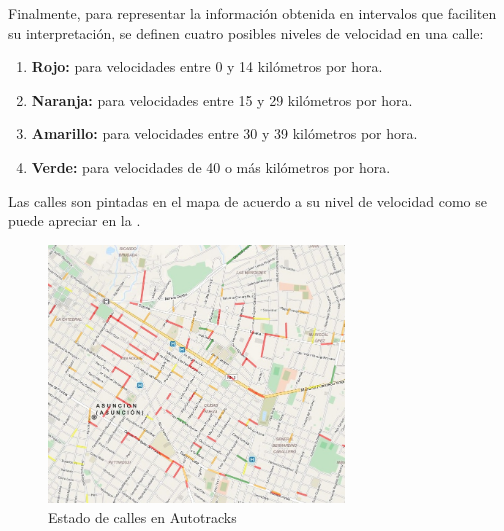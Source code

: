 Finalmente, para representar la información obtenida en intervalos que faciliten su interpretación, se definen cuatro posibles niveles de velocidad en una calle:
\begin{enumerate}
\item \textbf{Rojo:}  para velocidades entre 0 y 14 kilómetros por hora.
\item \textbf{Naranja:}  para velocidades entre 15 y 29 kilómetros por hora.
\item \textbf{Amarillo:}  para velocidades entre 30 y 39 kilómetros por hora.
\item \textbf{Verde:}  para velocidades de 40 o más kilómetros por hora.
\end{enumerate}
Las calles son pintadas en el mapa de acuerdo a su nivel de velocidad como se puede apreciar en la .
\begin{figure}[h]
	\centering
	\includegraphics[width=0.7\textwidth]{capitulos/6/figuras/figura3.jpg}
	\caption{\label{fig:calles} Estado de calles en Autotracks}	
\end{figure}
